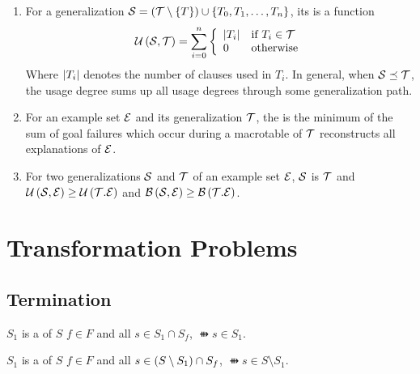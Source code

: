 \begin{defi}
\begin{enumerate}
 \item For a generalization $\mathcal{S}=\left( \mathcal{T}\setminus\left\{ T\right\}\right)\cup\left\{ T_0,T_1,\ldots,T_n\right\}$, its  is a function \stTx{}
 \begin{equation}
  \mathcal{U}\left(\mathcal{S},\mathcal{T}\right)=\displaystyle\sum_{i=0}^{n}{\left\{\begin{array}{ll}
  \left|T_i\right|&\mbox{if }T_i\in\mathcal{T}\\0&\mbox{otherwise}\end{array}\right.}
 \end{equation}
 Where $\left|T_i\right|$ denotes the number of clauses used in $T_i$. In general, when $\mathcal{S}\preceq\mathcal{T}$, the usage degree sums up all usage degrees through some generalization path.
 \item For an example set $\mathcal{E}$ and its generalization $\mathcal{T}$, the  is the minimum of the sum of goal failures which occur during a macrotable of $\mathcal{T}$ reconstructs all explanations of $\mathcal{E}$.
 \item  For two generalizations $\mathcal{S}$ and $\mathcal{T}$ of an example set $\mathcal{E}$, $\mathcal{S}$ is  $\mathcal{T}$ \iffTx{} and $\mathcal{U}\left(\mathcal{S},\mathcal{E}\right)\geq\mathcal{U}\left(\mathcal{T}.\mathcal{E}\right)$ and $\mathcal{B}\left(\mathcal{S},\mathcal{E}\right)\geq\mathcal{B}\left(\mathcal{T}.\mathcal{E}\right)$.
\end{enumerate}
\cite{conf/ijcai/YamamuraK91}
\end{defi}

\section{Transformation Problems}

\subsection{Termination}

\begin{defi}
$S_1$ is a  of $S$ \iffTx{} \faTx{} $f\in F$ and all $s\in S_1\cap S_f$, $\ffun{s}\in S_1$.
\cite{conf/ijcai/Florath75}
\end{defi}

\begin{defi}
$S_1$ is a  of $S$ \iffTx{} \faTx{} $f\in F$ and all $s\in \left( S\setminus S_1\right)\cap S_f$, $\ffun{s}\in S\setminus S_1$.
\cite{conf/ijcai/Florath75}
\end{defi}

